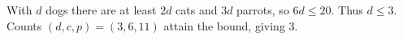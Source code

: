 With $d$ dogs there are at least $2d$ cats and $3d$ parrots, so $6d\le20$. Thus $d\le3$. Counts $(d,c,p)=(3,6,11)$ attain the bound, giving $\boxed3$.
